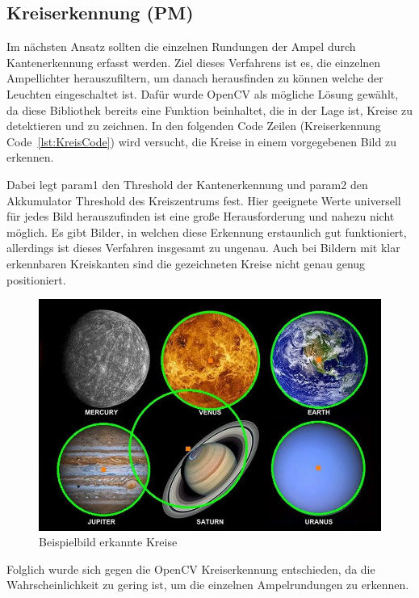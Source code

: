 \documentclass[a4paper,oneside,12pt]{report}
\begin{document}
\begin{onehalfspace}
		\section{Kreiserkennung (PM)}
		Im nächsten Ansatz sollten die einzelnen Rundungen der Ampel durch Kantenerkennung erfasst werden. Ziel dieses Verfahrens ist es, die einzelnen Ampellichter herauszufiltern, um danach herausfinden zu können welche der Leuchten eingeschaltet ist. Dafür wurde OpenCV als mögliche Lösung gewählt, da diese Bibliothek bereits eine Funktion beinhaltet, die in der Lage ist, Kreise zu detektieren und zu zeichnen. In den folgenden Code Zeilen (Kreiserkennung Code~\ref{lst:KreisCode}) wird versucht, die Kreise in einem vorgegebenen Bild zu erkennen.
		
		Dabei legt param1 den Threshold der Kantenerkennung und param2 den Akkumulator Threshold des Kreiszentrums fest. Hier geeignete Werte universell für jedes Bild herauszufinden ist eine große Herausforderung und nahezu nicht möglich. Es gibt Bilder, in welchen diese Erkennung erstaunlich gut funktioniert, allerdings ist dieses Verfahren insgesamt zu ungenau. Auch bei Bildern mit klar erkennbaren Kreiskanten sind die gezeichneten Kreise nicht genau genug positioniert.
		\begin{figure}[h!]
			\includegraphics[width=\linewidth]{circles_detected.jpg}
			\caption{Beispielbild erkannte Kreise}
			\label{fig:CirclesDetected}
		\end{figure}
		\newline
		Folglich wurde sich gegen die OpenCV Kreiserkennung entschieden, da die Wahrscheinlichkeit zu gering ist, um die einzelnen Ampelrundungen zu erkennen.

\end{onehalfspace}
\end{document}
